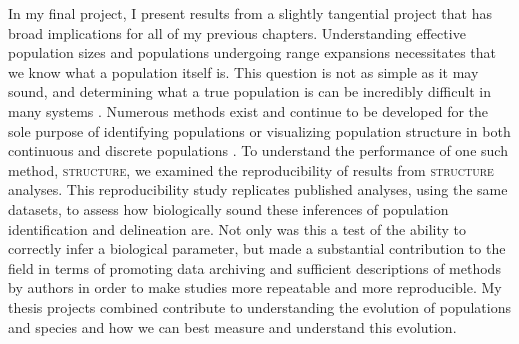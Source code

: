 In my final project,  I present results from a slightly tangential project that has broad implications for all of my previous chapters. Understanding effective population sizes and populations undergoing range expansions necessitates that we know what a population itself is. This question is not as simple as it may sound, and determining what a true population is can be incredibly difficult in many systems \citep{Waples:2006}. Numerous methods exist and continue to be developed for the sole purpose of identifying populations or visualizing population structure in both continuous and discrete populations \citep{Pritchard:2000, Falush:2003, Falush:2007, Rosenberg:2004, Petkova:2015, Bradburd:2016}. To understand the performance of one such method, \textsc{structure}, we examined the reproducibility of results from \textsc{structure} analyses. This reproducibility study replicates published analyses, using the same datasets, to assess how biologically sound these inferences of population identification and delineation are. Not only was this a test of the ability to correctly infer a biological parameter, but made a substantial contribution to the field in terms of promoting data archiving and sufficient descriptions of methods by authors in order to make studies more repeatable and more reproducible. My thesis projects combined contribute to understanding the evolution of populations and species and how we can best measure and understand this evolution.







